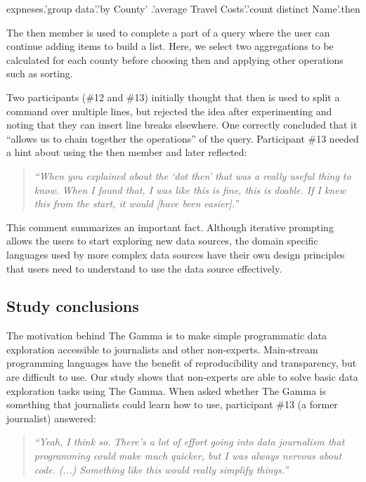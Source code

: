 \documentclass[manuscript,review,anonymous]{acmart}
\newcommand{\ikvd}[1]{{\fontfamily{zi4}\selectfont\small #1}}
\begin{document}
\begin{thegamma}
expneses.'group data'.'by County'
  .'average Travel Costs'.'count distinct Name'.then
\end{thegamma}

The \ikvd{then} member is used to complete a part of a query where the user can continue
adding items to build a list. Here, we select two aggregations to be calculated for each
county before choosing \ikvd{then} and applying other operations such as sorting.

Two participants (\#12 and \#13) initially thought that \ikvd{then} is used to split a command
over multiple lines, but rejected the idea after experimenting and noting that they can insert
line breaks elsewhere. One correctly concluded that it ``allows us to chain together the
operations'' of the query. Participant \#13 needed a hint about using the
\ikvd{then} member and later reflected:

\begin{quote}
  \emph{``When you explained about the `dot then' that was a really useful thing to know.
  When I found that, I was like this is fine, this is doable. If I knew this from the start,
  it would [have been easier].''}
\end{quote}

This comment summarizes an important fact. Although iterative prompting allows the users to start
exploring new data sources, the domain specific languages used by more complex data sources have
their own design principles that users need to understand to use the data source effectively.

\subsection{Study conclusions}
The motivation behind The Gamma is to make simple programmatic data exploration accessible to
journalists and other non-experts. Main-stream programming languages have the benefit of
reproducibility and transparency, but are difficult to use. Our study shows that non-experts
are able to solve basic data exploration tasks using The Gamma. When asked whether The Gamma
is something that journalists could learn how to use, participant \#13 (a former journalist) answered:

\begin{quote}
\emph{``Yeah, I think so. There's a lot of effort going into data journalism that
  programming could make much quicker, but I was always nervous about code. (...)
  Something like this would really simplify things.''}
\end{quote}
\end{document}
